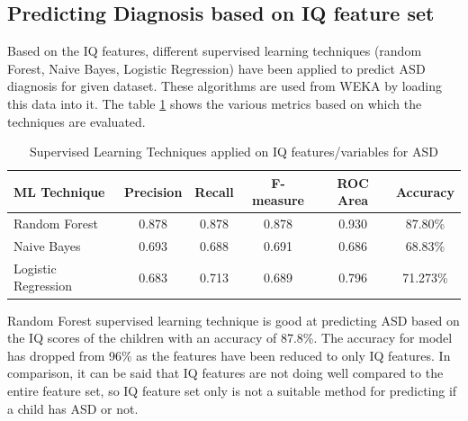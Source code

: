 \subsection{Predicting Diagnosis based on IQ feature set}
Based on the IQ features, different supervised learning techniques (random Forest, Naive Bayes, Logistic Regression) have been applied to predict ASD diagnosis for given dataset. These algorithms are used from WEKA by loading this data into it. The table \ref{table:63} shows the various metrics based on which the techniques are evaluated.
\begin{table}[h]
\begin{center}
\begin{tabular}{|l|c|c|c|c|c|}
\hline
\textbf{ML Technique}&	\textbf{Precision}&	\textbf{Recall}&	\textbf{F-measure}&	\textbf{ROC Area}&	\textbf{Accuracy}\\
\hline \hline
Random Forest&	0.878&	0.878&	0.878&	0.930&	87.80\%\\
\hline
Naive Bayes&	0.693&	0.688&	0.691&	0.686&	68.83\%\\
\hline
Logistic Regression	&0.683&	0.713&	0.689&	0.796&	71.273\%\\
\hline
\end{tabular}
\end{center}
\caption{Supervised Learning Techniques applied on IQ features/variables for ASD }
\label{table:63}
\end{table}

Random Forest supervised learning technique is good at predicting ASD based on the IQ scores of the children with an accuracy of 87.8\%. The accuracy for model has dropped from 96\% as the features have been reduced to only IQ features. In comparison, it can be said that IQ features are not doing well compared to the entire feature set, so IQ feature set only is not a suitable method for predicting if a child has ASD or not.


